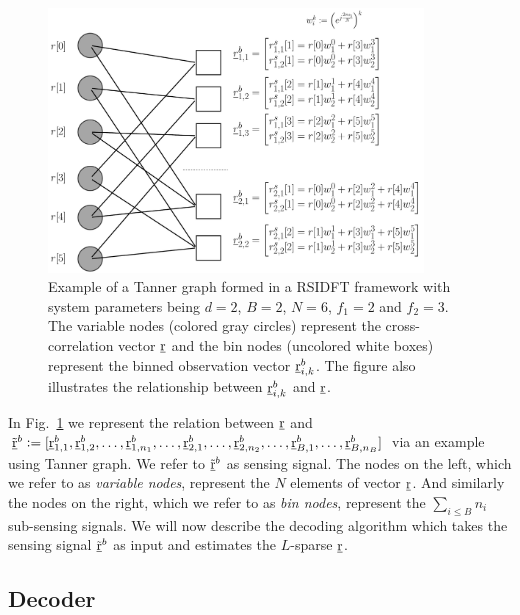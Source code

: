 \begin{enumerate}
\begin{figure}[h!]
	\begin{center}
		\includegraphics[height=7cm]{Figures/Factorgraph} 
	\end{center}	   
	\caption{Example of a Tanner graph formed in a RSIDFT framework with system parameters being $d=2$, $B=2$, $N=6$, $f_1 = 2$ and $f_2=3$. The variable nodes (colored gray circles) represent the cross-correlation vector $\underline{\mathrm{r}}$ and the bin nodes (uncolored white boxes) represent the binned observation vector $\underline{\mathrm{r}}_{i,k}^b$. The figure also illustrates the relationship between $\underline{\mathrm{r}}_{i,k}^b$ and $\underline{\mathrm{r}}$.}\label{fig:factorgraph}
	\vspace{5 pt}
\end{figure}

In Fig.~\ref{fig:factorgraph} we represent the relation between $\underline{\mathrm{r}}$ and $\tilde{\underline{\mathrm{r}}}^{b}\mathrel{\mathop:}=[\underline{\mathrm{r}}^{b}_{1,1},\underline{\mathrm{r}}^{b}_{1,2},\ldots,\underline{\mathrm{r}}^{b}_{1,n_1},\ldots, \underline{\mathrm{r}}^{b}_{2,1},\ldots,\underline{\mathrm{r}}^{b}_{2,n_2},\ldots, \underline{\mathrm{r}}^{b}_{B,1},\ldots,\underline{\mathrm{r}}^{b}_{B,n_B}]$
via an example using Tanner graph. We refer to $\tilde{\underline{\mathrm{r}}}^{b}$ as sensing signal. The nodes on the left, which we refer to as {\it variable nodes}, represent the $N$ elements of vector $\underline{\mathrm{r}}$. And similarly the nodes on the right, which we refer to as {\it bin nodes}, represent the $\sum_{i\leq B} n_i$ sub-sensing signals. We will now describe the decoding algorithm which takes the sensing signal $\tilde{\underline{\mathrm{r}}}^b$ as input and estimates the $L$-sparse $\underline{\mathrm{r}}$.	 

\subsection{Decoder}		
	

\end{enumerate}
